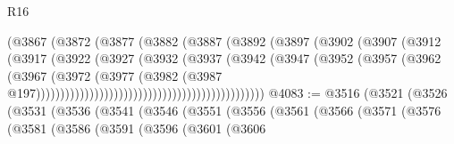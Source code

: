 \begin{lexlean}{R16}
\begin{coremodule}
                                                (@3867
                                                  (@3872
                                                    (@3877
                                                      (@3882
                                                        (@3887
                                                          (@3892
                                                            (@3897
                                                              (@3902
                                                                (@3907
                                                                  (@3912
                                                                    (@3917
                                                                      (@3922
                                                                        (@3927
                                                                          (@3932
                                                                            (@3937
                                                                              (@3942
                                                                                (@3947
                                                                                  (@3952
                                                                                    (@3957
                                                                                      (@3962
                                                                                        (@3967
                                                                                          (@3972
                                                                                            (@3977
                                                                                              (@3982
                                                                                                (@3987
                                                                                                  @197)))))))))))))))))))))))))))))))))))))))))))))))
@4083 := @3516
    (@3521
      (@3526
        (@3531
          (@3536
            (@3541
              (@3546
                (@3551
                  (@3556
                    (@3561
                      (@3566
                        (@3571
                          (@3576
                            (@3581
                              (@3586
                                (@3591
                                  (@3596
                                    (@3601
                                      (@3606

\end{coremodule}
\end{lexlean}
